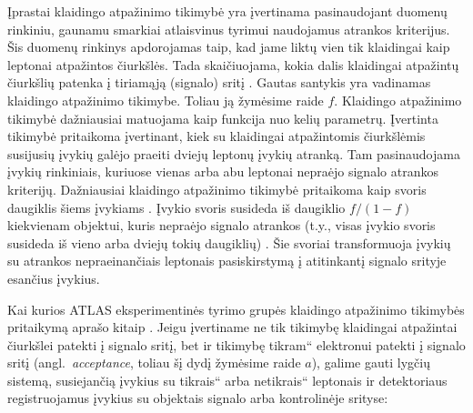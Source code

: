 \documentclass[a4paper, 12pt, oneside]{article}
\newcommand{\ltq}[1]{{\quotedblbase{}#1\textquotedblleft{}}}
\newlength\q
\begin{document}
Įprastai klaidingo atpažinimo tikimybė yra įvertinama pasinaudojant duomenų rinkiniu, gaunamu smarkiai atlaisvinus
tyrimui naudojamus atrankos kriterijus.
Šis duomenų rinkinys apdorojamas taip, kad jame liktų vien tik klaidingai kaip leptonai atpažintos čiurkšlės.
Tada skaičiuojama, kokia dalis klaidingai atpažintų čiurkšlių patenka į tiriamąją (signalo) sritį
\cite{DY_ATLAS2016, Z'_ATLAS2011, Z'_CMS2011, Z'_ATLAS2014, Z'_CMS2015}.
Gautas santykis yra vadinamas klaidingo atpažinimo tikimybe.
Toliau ją žymėsime raide $f$.
Klaidingo atpažinimo tikimybė dažniausiai matuojama kaip funkcija nuo kelių parametrų.
Įvertinta tikimybė pritaikoma įvertinant, kiek su klaidingai atpažintomis čiurkšlėmis susijusių įvykių
galėjo praeiti dviejų leptonų įvykių atranką.
Tam pasinaudojama įvykių rinkiniais, kuriuose vienas arba abu leptonai nepraėjo signalo atrankos kriterijų.
Dažniausiai klaidingo atpažinimo tikimybė pritaikoma kaip svoris daugiklis šiems įvykiams \cite{Z'_ATLAS2011, Z'_CMS2011, Z'_CMS2015}.
Įvykio svoris susideda iš daugiklio $f/(1-f)$ kiekvienam objektui, kuris nepraėjo signalo atrankos (t.y., visas įvykio svoris
susideda iš vieno arba dviejų tokių daugiklių) \cite{Z'_CMS2015}.
Šie svoriai transformuoja įvykių su atrankos nepraeinančiais leptonais pasiskirstymą į atitinkantį signalo
srityje esančius įvykius.

Kai kurios ATLAS eksperimentinės tyrimo grupės klaidingo atpažinimo tikimybės pritaikymą aprašo kitaip \cite{DY_ATLAS2016, Z'_ATLAS2014}.
Jeigu įvertiname ne tik tikimybę klaidingai atpažintai čiurkšlei patekti į signalo sritį, bet ir tikimybę \ltq{tikram}
elektronui patekti į signalo sritį (angl.\ \textit{acceptance}, toliau šį dydį žymėsime raide $a$), galime gauti lygčių sistemą,
susiejančią įvykius su \ltq{tikrais} arba \ltq{netikrais} leptonais ir detektoriaus registruojamus įvykius su objektais signalo
arba kontrolinėje srityse:
\end{document}
